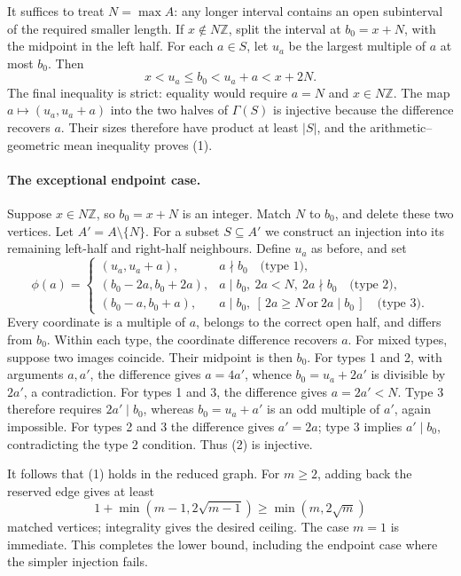 It suffices to treat \(N=\max A\): any longer interval contains
an open subinterval of the required smaller length.
If \(x\notin N\mathbb Z\), split the interval at \(b_0=x+N\), with
the midpoint in the left half. For each \(a\in S\), let \(u_a\)
be the largest multiple of \(a\) at most \(b_0\). Then
\[
 x<u_a\leq b_0<u_a+a<x+2N.
\]
The final inequality is strict: equality would require \(a=N\)
and \(x\in N\mathbb Z\).
The map \(a\mapsto(u_a,u_a+a)\) into the two halves of \(\Gamma(S)\)
is injective because the difference recovers \(a\).
Their sizes therefore have product at least \(|S|\), and the
arithmetic--geometric mean inequality proves (1).

\paragraph{The exceptional endpoint case.}
Suppose \(x\in N\mathbb Z\), so \(b_0=x+N\) is an integer.
Match \(N\) to \(b_0\), and delete these two vertices.
Let \(A'=A\setminus\{N\}\). For a subset \(S\subseteq A'\) we
construct an injection into its remaining left-half and right-half
neighbours. Define \(u_a\) as before, and set
\[
 \phi(a)=
 \begin{cases}
 (u_a,u_a+a),&
   a\nmid b_0 \quad\text{(type 1)},\\
 (b_0-2a,b_0+2a),&
   a\mid b_0,\ 2a<N,\ 2a\nmid b_0 \quad\text{(type 2)},\\
 (b_0-a,b_0+a),&
   a\mid b_0,\ [\,2a\geq N\ \text{or}\ 2a\mid b_0\,]
          \quad\text{(type 3)}.
 \end{cases}                                                     \tag{2}
\]
Every coordinate is a multiple of \(a\), belongs to the correct
open half, and differs from \(b_0\).
Within each type, the coordinate difference recovers \(a\).
For mixed types, suppose two images coincide.
Their midpoint is then \(b_0\).
For types 1 and 2, with arguments \(a,a'\), the difference gives
\(a=4a'\), whence \(b_0=u_a+2a'\) is divisible by \(2a'\),
a contradiction.
For types 1 and 3, the difference gives \(a=2a'<N\).
Type 3 therefore requires \(2a'\mid b_0\), whereas
\(b_0=u_a+a'\) is an odd multiple of \(a'\), again impossible.
For types 2 and 3 the difference gives \(a'=2a\);
type 3 implies \(a'\mid b_0\), contradicting the type 2 condition.
Thus (2) is injective.

It follows that (1) holds in the reduced graph.
For \(m\geq2\), adding back the reserved edge gives at least
\[
 1+\min(m-1,2\sqrt{m-1})\geq\min(m,2\sqrt m)
\]
matched vertices; integrality gives the desired ceiling.
The case \(m=1\) is immediate. This completes the lower bound,
including the endpoint case where the simpler injection fails.

